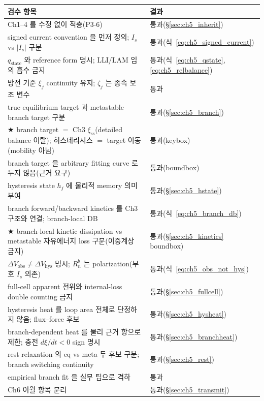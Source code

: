 \documentclass[11pt,a4paper]{article}
\newcommand{\hys}{\mathrm{hys}}
\newcommand{\obs}{\mathrm{obs}}
\newcommand{\stt}{\mathrm{state}}
\newcommand{\sstat}{\mathrm{ss}}
\begin{document}
{\small
\begin{longtable}{p{} p{}}
\toprule 검수 항목 & 결과 \\ \midrule \endhead
Ch1--4 를 수정 없이 적층(P3-6) & 통과(\S\ref{sec:ch5_inherit}) \\
signed current convention 을 먼저 정의; $I_s$ vs $|I_s|$ 구분 & 통과(식~\eqref{eq:ch5_signed_current}) \\
$q_\stt$ 와 reference form 명시; LLI/LAM 임의 흡수 금지 & 통과(식~\eqref{eq:ch5_qstate},\eqref{eq:ch5_relbalance}) \\
방전 기준 $\xi_j$ continuity 유지; $\zeta_j$ 는 종속 보조 변수 & 통과 \\
true equilibrium target 과 metastable branch target 구분 & 통과(\S\ref{sec:ch5_branch}) \\
★ branch target $=$ Ch3 $\xi_{\sstat}$(detailed balance 이탈); 히스테리시스 $=$ target 이동(mobility 아님) & 통과(keybox) \\
branch target 을 arbitrary fitting curve 로 두지 않음(근거 요구) & 통과(boundbox) \\
hysteresis state $h_j$ 에 물리적 memory 의미 부여 & 통과(\S\ref{sec:ch5_hstate}) \\
branch forward/backward kinetics 를 Ch3 구조와 연결; branch-local DB & 통과(식~\eqref{eq:ch5_branch_db}) \\
★ branch-local kinetic dissipation vs metastable 자유에너지 loss 구분(이중계상 금지) & 통과(\S\ref{sec:ch5_kinetics} boundbox) \\
$\Delta V_\obs\ne\Delta V_\hys$ 명시; $R_n^b$ 는 polarization(부호 $I_s$ 의존) & 통과(식~\eqref{eq:ch5_obs_not_hys}) \\
full-cell apparent 전위와 internal-loss double counting 금지 & 통과(\S\ref{sec:ch5_fullcell}) \\
hysteresis heat 를 loop area 전체로 단정하지 않음; flux--force 후보 & 통과(\S\ref{sec:ch5_hysheat}) \\
branch-dependent heat 를 물리 근거 항으로 제한; 충전 $d\xi/dt<0$ sign 명시 & 통과(\S\ref{sec:ch5_branchheat}) \\
rest relaxation 의 eq vs meta 두 후보 구분; branch switching continuity & 통과(\S\ref{sec:ch5_rest}) \\
empirical branch fit 을 실무 팁으로 격하 & 통과 \\
Ch6 이월 항목 분리 & 통과(\S\ref{sec:ch5_transmit}) \\
\bottomrule
\end{longtable}
}
\end{document}
